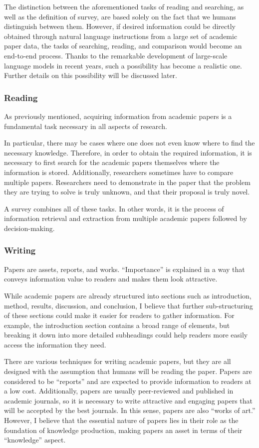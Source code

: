 \documentclass{book}
\begin{document}
The distinction between the aforementioned tasks of reading and searching, as well as the definition of survey, are based solely on the fact that we humans distinguish between them. However, if desired information could be directly obtained through natural language instructions from a large set of academic paper data, the tasks of searching, reading, and comparison would become an end-to-end process. Thanks to the remarkable development of large-scale language models in recent years, such a possibility has become a realistic one. Further details on this possibility will be discussed later.

\subsubsection{Reading}
As previously mentioned, acquiring information from academic papers is a fundamental task necessary in all aspects of research.

In particular, there may be cases where one does not even know where to find the necessary knowledge. Therefore, in order to obtain the required information, it is necessary to first search for the academic papers themselves where the information is stored. 
Additionally, researchers sometimes have to compare multiple papers. Researchers need to demonstrate in the paper that the problem they are trying to solve is truly unknown, and that their proposal is truly novel.

A survey combines all of these tasks. In other words, it is the process of information retrieval and extraction from multiple academic papers followed by decision-making.
\subsubsection{Writing}

Papers are assets, reports, and works.
``Importance'' is explained in a way that conveys information value to readers and makes them look attractive.

While academic papers are already structured into sections such as introduction, method, results, discussion, and conclusion, I believe that further sub-structuring of these sections could make it easier for readers to gather information. For example, the introduction section contains a broad range of elements, but breaking it down into more detailed subheadings could help readers more easily access the information they need.

There are various techniques for writing academic papers, but they are all designed with the assumption that humans will be reading the paper. Papers are considered to be ``reports'' and are expected to provide information to readers at a low cost. Additionally, papers are usually peer-reviewed and published in academic journals, so it is necessary to write attractive and engaging papers that will be accepted by the best journals. In this sense, papers are also ``works of art.'' However, I believe that the essential nature of papers lies in their role as the foundation of knowledge production, making papers an asset in terms of their ``knowledge'' aspect.
\end{document}
